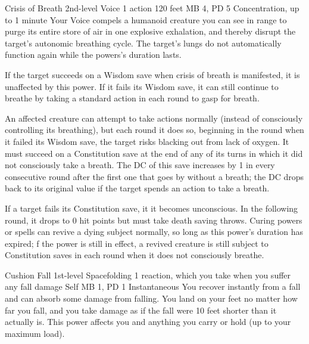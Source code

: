 \DndPowerHeader%
  {Crisis of Breath}
  {2nd-level Voice}
  {1 action}
  {120 feet}
  {MB 4, PD 5}
  {Concentration, up to 1 minute}
  Your Voice compels a humanoid creature you can see in range
  to purge its entire store of air
  in one explosive exhalation,
  and thereby disrupt the target's autonomic breathing cycle.
  The target's lungs do not automatically function
  again while the powers's duration lasts.

  If the target succeeds on a Wisdom save when
  crisis of breath is manifested,
  it is unaffected by this power.
  If it fails its Wisdom save,
  it can still continue to breathe by taking a standard action
  in each round to gasp for breath.
  
  An affected creature can attempt to take actions normally
  (instead of consciously controlling its breathing),
  but each round it does so,
  beginning in the round when it failed its Wisdom save,
  the target risks blacking out from lack of oxygen.
  It must succeed on a Constitution save
  at the end of any of its turns in which
  it did not consciously take a breath.
  The DC of this save increases by 1 in every consecutive
  round after the first one that goes by without a breath;
  the DC drops back to its original value
  if the target spends an action to take a breath.
  
  If a target fails its Constitution save,
  it it becomes unconscious.
  In the following round,
  it drops to 0 hit points
  but must take death saving throws.
  Curing powers or spells can revive a dying subject normally,
  so long as this power's duration has expired; 
  f the power is still in effect,
  a revived creature is still subject to Constitution saves
  in each round when it does not consciously breathe.

\DndPowerHeader%
  {Cushion Fall}
  {1st-level Spacefolding}
  {1 reaction, which you take when you suffer any fall damage}
  {Self}
  {MB 1, PD 1}
  {Instantaneous}
  You recover instantly from a fall
  and can absorb some damage from falling.
  You land on your feet no matter how far you fall,
  and you take damage as if the fall were
  10 feet shorter than it actually is.
  This power affects you and anything you carry or hold
  (up to your maximum load).

